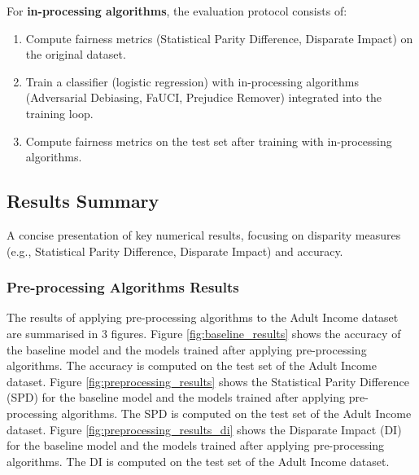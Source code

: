 \documentclass[12pt,a4paper,openright,twoside]{book}
\begin{document}
For \textbf{in-processing algorithms}, the evaluation protocol consists of:
\begin{enumerate}
    \item Compute fairness metrics (Statistical Parity Difference, Disparate Impact) on the original dataset.
    \item Train a classifier (logistic regression) with in-processing algorithms (Adversarial Debiasing, FaUCI, Prejudice Remover) integrated into the training loop.
    \item Compute fairness metrics on the test set after training with in-processing algorithms.
\end{enumerate}

\subsection{Results Summary}
A concise presentation of key numerical results, focusing on disparity measures (e.g., Statistical Parity Difference, Disparate Impact) and accuracy.
\subsubsection{Pre-processing Algorithms Results}
The results of applying pre-processing algorithms to the Adult Income dataset are summarised in 3 figures. Figure \ref{fig:baseline_results} shows the accuracy of the baseline model and the models trained after applying pre-processing algorithms. The accuracy is computed on the test set of the Adult Income dataset.
Figure \ref{fig:preprocessing_results} shows the Statistical Parity Difference (SPD) for the baseline model and the models trained after applying pre-processing algorithms. The SPD is computed on the test set of the Adult Income dataset. Figure \ref{fig:preprocessing_results_di} shows the Disparate Impact (DI) for the baseline model and the models trained after applying pre-processing algorithms. The DI is computed on the test set of the Adult Income dataset.
\end{document}
